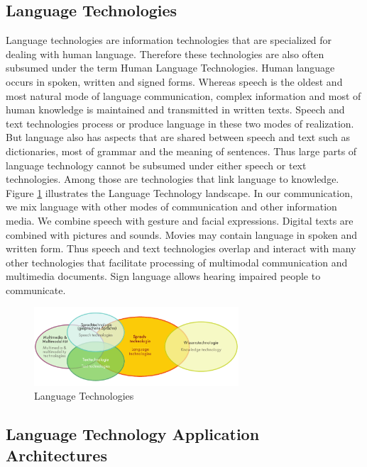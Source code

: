 \documentclass[]{../metanetpaper}
\begin{document}
\begin{multicols}{2}

\subsection{Language Technologies}
Language technologies are information technologies that are
specialized for dealing with human language. Therefore these
technologies are also often subsumed under the term Human Language
Technologies. Human language occurs in spoken, written and signed
forms. Whereas speech is the oldest and most natural mode of language
communication, complex information and most of human knowledge is
maintained and transmitted in written texts. Speech and text
technologies process or produce language in these two modes of
realization. But language also has aspects that are shared between
speech and text such as dictionaries, most of grammar and the meaning
of sentences. Thus large parts of language technology cannot be
subsumed under either speech or text technologies. Among those are
technologies that link language to knowledge. Figure \ref{fig:languagetechnoEng} 
illustrates the Language Technology landscape. In our communication,
we mix language with other modes of communication and other
information media. We combine speech with gesture and facial
expressions. Digital texts are combined with pictures and
sounds. Movies may contain language in spoken and written form. Thus
speech and text technologies overlap and interact with many other
technologies that facilitate processing of multimodal communication
and multimedia documents. Sign language allows hearing impaired people to communicate.

\begin{figure}
\begin{center}
 \includegraphics[width=3.0in]{../_media/language_technologies} 
\caption{Language Technologies}
\label{fig:languagetechnoEng}
\end{center}
\end{figure}

\subsection{Language Technology Application Architectures}


\end{multicols}
\end{document}
